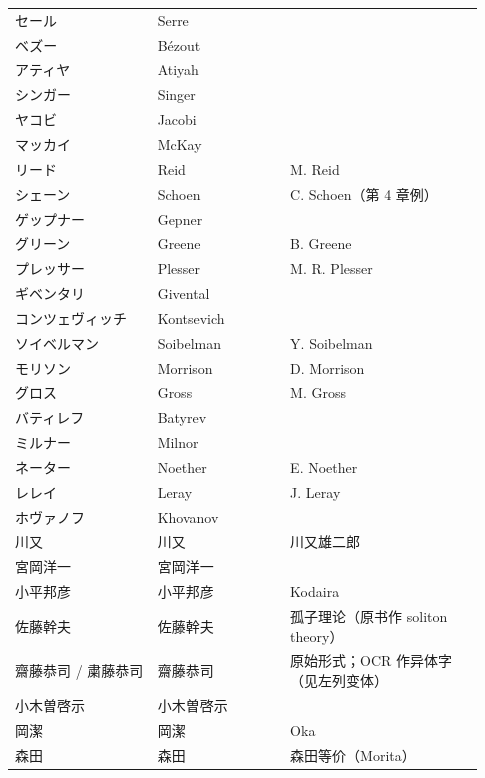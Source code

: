\begin{longtable}{@{}>{\raggedright\arraybackslash}p{0.29\linewidth}>{\raggedright\arraybackslash}p{0.26\linewidth}>{\raggedright\arraybackslash}p{0.38\linewidth}@{}}
セール & Serre &  \\
ベズー & Bézout &  \\
アティヤ & Atiyah &  \\
シンガー & Singer &  \\
ヤコビ & Jacobi &  \\
マッカイ & McKay &  \\
リード & Reid & M. Reid \\
シェーン & Schoen & C. Schoen（第 4 章例） \\
ゲップナー & Gepner &  \\
グリーン & Greene & B. Greene \\
プレッサー & Plesser & M. R. Plesser \\
ギベンタリ & Givental &  \\
コンツェヴィッチ & Kontsevich &  \\
ソイベルマン & Soibelman & Y. Soibelman \\
モリソン & Morrison & D. Morrison \\
グロス & Gross & M. Gross \\
バティレフ & Batyrev &  \\
ミルナー & Milnor &  \\
ネーター & Noether & E. Noether \\
レレイ & Leray & J. Leray \\
ホヴァノフ & Khovanov &  \\
川又 & \mbox{川又} & 川又雄二郎 \\
宮岡洋一 & \mbox{宮岡洋一} &  \\
小平邦彦 & \mbox{小平邦彦} & Kodaira \\
佐藤幹夫 & \mbox{佐藤幹夫} & 孤子理论（原书作 soliton theory） \\
齋藤恭司 / 粛藤恭司 & \mbox{齋藤恭司} & 原始形式；OCR 作异体字（见左列变体） \\
小木曽啓示 & \mbox{小木曽啓示} &  \\
岡潔 & \mbox{岡潔} & Oka \\
森田 & \mbox{森田} & 森田等价（Morita） \\
\end{longtable}
\normalsize
